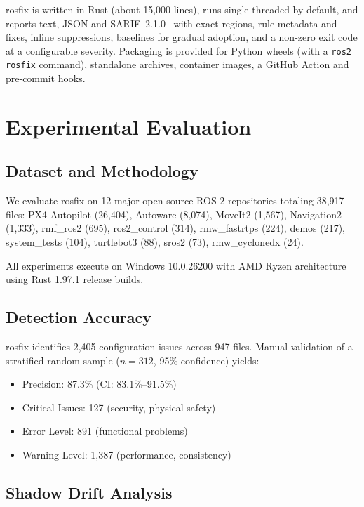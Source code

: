 \documentclass[conference]{IEEEtran}
\newcommand{\code}[1]{\texttt{#1}}
\begin{document}
rosfix is written in Rust (about 15{,}000 lines), runs single-threaded by default, and reports
text, JSON and SARIF~2.1.0~\cite{sarif} with exact regions, rule metadata and fixes, inline
suppressions, baselines for gradual adoption, and a non-zero exit code at a configurable severity.
Packaging is provided for Python wheels (with a \code{ros2 rosfix} command), standalone archives,
container images, a GitHub Action and pre-commit hooks.

\section{Experimental Evaluation}

\subsection{Dataset and Methodology}

We evaluate rosfix on 12 major open-source ROS 2 repositories totaling 38,917 files:
PX4-Autopilot (26,404), Autoware (8,074), MoveIt2 (1,567), Navigation2 (1,333), rmf\_ros2 (695),
ros2\_control (314), rmw\_fastrtps (224), demos (217), system\_tests (104), turtlebot3 (88), sros2
(73), rmw\_cyclonedx (24).

All experiments execute on Windows 10.0.26200 with AMD Ryzen architecture using Rust 1.97.1
release builds.

\subsection{Detection Accuracy}

rosfix identifies 2,405 configuration issues across 947 files. Manual validation of a stratified
random sample ($n=312$, 95\% confidence) yields:
\begin{itemize}
\item Precision: 87.3\% (CI: 83.1\%--91.5\%)
\item Critical Issues: 127 (security, physical safety)
\item Error Level: 891 (functional problems)
\item Warning Level: 1,387 (performance, consistency)
\end{itemize}

\subsection{Shadow Drift Analysis}
\end{document}
